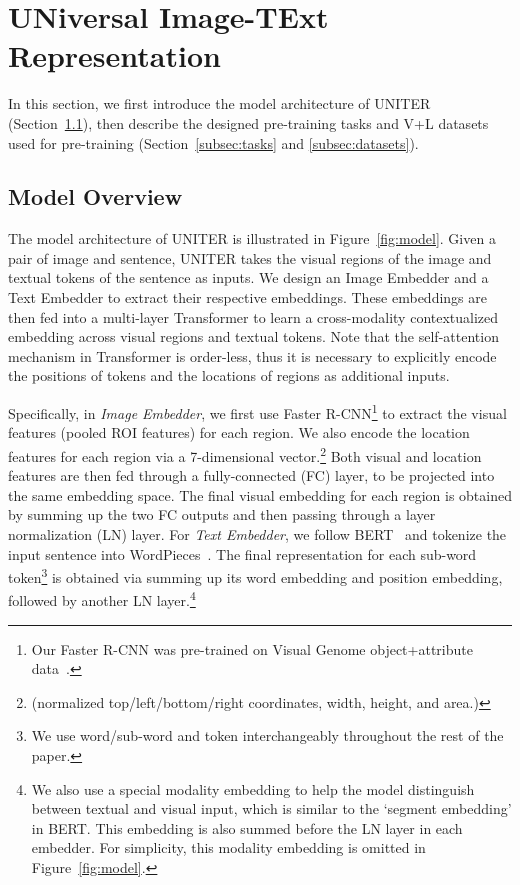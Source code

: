\documentclass[runningheads]{llncs}
\begin{document}
 \section{UNiversal Image-TExt Representation}
In this section, we first introduce the model architecture of UNITER (Section~\ref{subsec:overview}), then describe the  designed pre-training tasks and V+L datasets used for pre-training (Section~\ref{subsec:tasks} and \ref{subsec:datasets}).

\subsection{Model Overview}\label{subsec:overview}



The model architecture of UNITER is illustrated in Figure~\ref{fig:model}.
Given a pair of image and sentence, UNITER takes the visual regions of the image and textual tokens of the sentence as inputs.
We design an Image Embedder and a Text Embedder to extract their respective embeddings.
These embeddings are then fed into a multi-layer Transformer to learn a cross-modality contextualized embedding across visual regions and textual tokens. 
Note that the self-attention mechanism in Transformer is order-less, thus it is necessary to explicitly encode the positions of tokens and the locations of regions as additional inputs.

Specifically, in \emph{Image Embedder}, we first use Faster R-CNN\footnote{Our Faster R-CNN was pre-trained on Visual Genome object+attribute data~\cite{anderson2018bottom}.} to extract the visual features (pooled ROI features) for each region. We also encode the location features for each region via a 7-dimensional vector.\footnote{\mbox{} (normalized top/left/bottom/right coordinates, width, height, and area.)}
Both visual and location features are then fed through a fully-connected (FC) layer, to be projected into the same embedding space.
The final visual embedding for each region is obtained by summing up the two FC outputs and then passing through a layer normalization (LN) layer.
For \emph{Text Embedder}, we follow BERT~\cite{devlin2018bert} and tokenize the input sentence into WordPieces~\cite{wu2016google}.
The final representation for each sub-word token\footnote{We use word/sub-word and token interchangeably throughout the rest of the paper.} is obtained via summing up its word embedding and position embedding, followed by another LN layer.\footnote{We also use a special modality embedding to help the model distinguish between textual and visual input, which is similar to the `segment embedding' in BERT. This embedding is also summed before the LN layer in each embedder. For simplicity, this modality embedding is omitted in Figure~\ref{fig:model}.}
\end{document}
